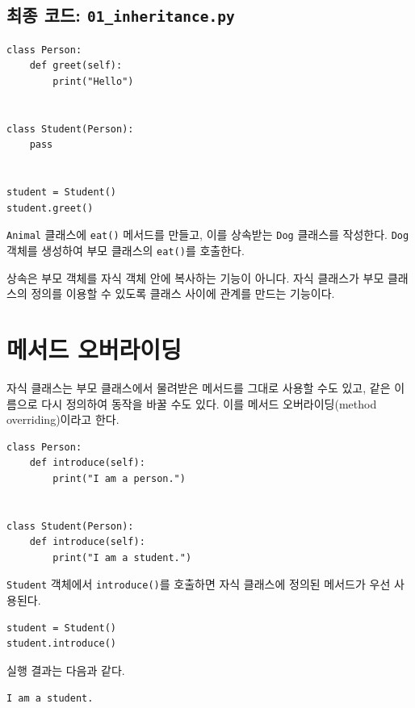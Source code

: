 \documentclass[11pt,a4paper]{article}
\begin{document}
\subsection{최종 코드: \texttt{01\_inheritance.py}}

\begin{lstlisting}
class Person:
    def greet(self):
        print("Hello")


class Student(Person):
    pass


student = Student()
student.greet()
\end{lstlisting}

\begin{practicebox}
\texttt{Animal} 클래스에 \texttt{eat()} 메서드를 만들고, 이를 상속받는 \texttt{Dog} 클래스를 작성한다. \texttt{Dog} 객체를 생성하여 부모 클래스의 \texttt{eat()}를 호출한다.
\end{practicebox}

\begin{importantbox}
상속은 부모 객체를 자식 객체 안에 복사하는 기능이 아니다. 자식 클래스가 부모 클래스의 정의를 이용할 수 있도록 클래스 사이에 관계를 만드는 기능이다.
\end{importantbox}

\section{메서드 오버라이딩}

자식 클래스는 부모 클래스에서 물려받은 메서드를 그대로 사용할 수도 있고, 같은 이름으로 다시 정의하여 동작을 바꿀 수도 있다. 이를 메서드 오버라이딩(method overriding)이라고 한다.

\begin{lstlisting}
class Person:
    def introduce(self):
        print("I am a person.")


class Student(Person):
    def introduce(self):
        print("I am a student.")
\end{lstlisting}

\texttt{Student} 객체에서 \texttt{introduce()}를 호출하면 자식 클래스에 정의된 메서드가 우선 사용된다.

\begin{lstlisting}
student = Student()
student.introduce()
\end{lstlisting}

실행 결과는 다음과 같다.

\begin{verbatim}
I am a student.
\end{verbatim}
\end{document}
